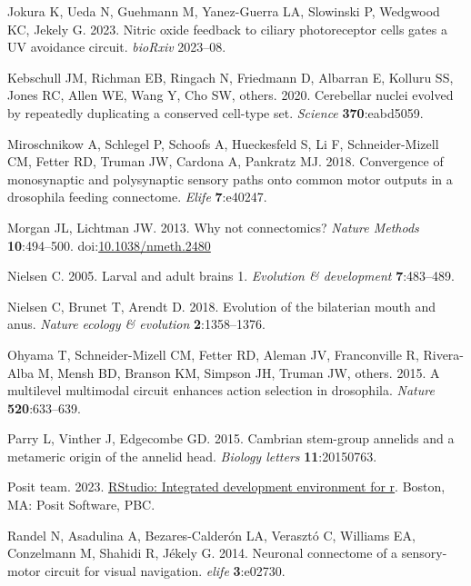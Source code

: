 \documentclass[
  11pt,
]{article}
\newlength{\cslhangindent}
\newenvironment{CSLReferences}[2] %
 {\begin{list}{}{%
  \setlength{\itemindent}{0pt}
  \setlength{\leftmargin}{0pt}
  \setlength{\parsep}{0pt}
  \ifodd #1
   \setlength{\leftmargin}{\cslhangindent}
   \setlength{\itemindent}{-1\cslhangindent}
  \fi
  \setlength{\itemsep}{#2\baselineskip}}}
 {\end{list}}
\begin{document}
\begin{CSLReferences}{1}{0}
Jokura K, Ueda N, Guehmann M, Yanez-Guerra LA, Slowinski P, Wedgwood KC,
Jekely G. 2023. Nitric oxide feedback to ciliary photoreceptor cells
gates a UV avoidance circuit. \emph{bioRxiv} 2023--08.

Kebschull JM, Richman EB, Ringach N, Friedmann D, Albarran E, Kolluru
SS, Jones RC, Allen WE, Wang Y, Cho SW, others. 2020. Cerebellar nuclei
evolved by repeatedly duplicating a conserved cell-type set.
\emph{Science} \textbf{370}:eabd5059.

Miroschnikow A, Schlegel P, Schoofs A, Hueckesfeld S, Li F,
Schneider-Mizell CM, Fetter RD, Truman JW, Cardona A, Pankratz MJ. 2018.
Convergence of monosynaptic and polysynaptic sensory paths onto common
motor outputs in a drosophila feeding connectome. \emph{Elife}
\textbf{7}:e40247.

Morgan JL, Lichtman JW. 2013. Why not connectomics? \emph{Nature
Methods} \textbf{10}:494--500.
doi:\href{https://doi.org/10.1038/nmeth.2480}{10.1038/nmeth.2480}

Nielsen C. 2005. Larval and adult brains 1. \emph{Evolution \&
development} \textbf{7}:483--489.

Nielsen C, Brunet T, Arendt D. 2018. Evolution of the bilaterian mouth
and anus. \emph{Nature ecology \& evolution} \textbf{2}:1358--1376.

Ohyama T, Schneider-Mizell CM, Fetter RD, Aleman JV, Franconville R,
Rivera-Alba M, Mensh BD, Branson KM, Simpson JH, Truman JW, others.
2015. A multilevel multimodal circuit enhances action selection in
drosophila. \emph{Nature} \textbf{520}:633--639.

Parry L, Vinther J, Edgecombe GD. 2015. Cambrian stem-group annelids and
a metameric origin of the annelid head. \emph{Biology letters}
\textbf{11}:20150763.

Posit team. 2023. \href{http://www.posit.co/}{RStudio: Integrated
development environment for r}. Boston, MA: Posit Software, PBC.

Randel N, Asadulina A, Bezares-Calderón LA, Verasztó C, Williams EA,
Conzelmann M, Shahidi R, Jékely G. 2014. Neuronal connectome of a
sensory-motor circuit for visual navigation. \emph{elife}
\textbf{3}:e02730.


\end{CSLReferences}
\end{document}
